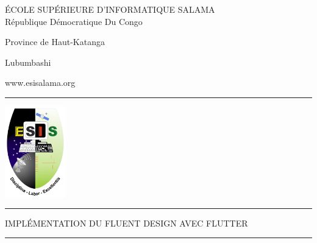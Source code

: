 \documentclass[a4paper,11pt]{report}
\begin{document}

    \begin{titlepage}
        \begin{center}
            {\LARGE ÉCOLE SUPÉRIEURE D’INFORMATIQUE SALAMA}\\
            {\large République Démocratique Du Congo}
            
            {\large Province de Haut-Katanga}
            
            {\large Lubumbashi}
            
            {\large www.esisalama.org}
            \vspace{10pt}
            
            \rule[30pt]{300pt}{1pt}
        \end{center}
        \begin{center}
            \includegraphics[width=100]{images/logo.png}
        \end{center}
        
        \vspace{10pt}

        \begin{center}
            
            \rule[1opt]{\textwidth}{1pt}
            {\LARGE IMPLÉMENTATION DU FLUENT DESIGN AVEC FLUTTER }
            \rule[10pt]{\textwidth}{1pt}
        \end{center}

    \end{titlepage}
\end{document}
